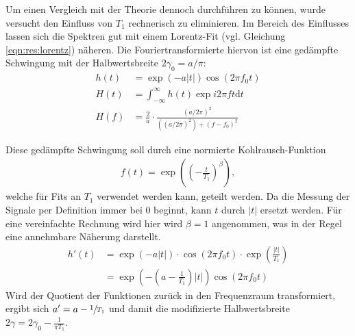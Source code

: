 Um einen Vergleich mit der Theorie dennoch durchführen zu können, wurde versucht den Einfluss von $T_1$ rechnerisch zu eliminieren. Im Bereich des Einflusses lassen sich die Spektren gut mit einem Lorentz-Fit (vgl. Gleichung \eqref{eqn:res:lorentz}) näheren. Die Fouriertransformierte hiervon ist eine gedämpfte Schwingung mit der Halbwertsbreite $2 \gamma_0 = a/\pi$:
\begin{align}
	h(t) & = \exp{(-a |t|)} \cos{(2 \pi f_0 t)} \\
	H(t) & = \int_{-\infty}^{\infty} h(t) \exp{i 2 \pi f t} \text{d} t \\
	H(f) & = \frac{2}{a} \cdot \frac{(a/2\pi)^2}{((a/2\pi)^2) + (f - f_0)^2}
\end{align}

Diese gedämpfte Schwingung soll durch eine normierte Kohlrausch-Funktion
\begin{align}
	f(t) = \exp{\left( {\left(-\frac{t}{T_1} \right)}^\beta \right) },
\end{align}
welche für Fits an $T_1$ verwendet werden kann, geteilt werden. Da die Messung der Signale per Definition immer bei 0 beginnt, kann $t$ durch $|t|$ ersetzt werden. Für eine vereinfachte Rechnung wird hier wird $\beta = 1$ angenommen, was in der Regel eine annehmbare Näherung darstellt.
\begin{align}
	h'(t) &= \exp{(-a \lvert t \rvert)} \cdot \cos{(2 \pi f_0 t)} \cdot \exp{\left(\frac{|t|}{T_1} \right)} \\
	&= \exp{\left(- \left(a - \frac{1}{T_1}\right) |t|\right)} \cos{(2 \pi f_0 t)}
\end{align}
Wird der Quotient der Funktionen zurück in den Frequenzraum transformiert, ergibt sich $a' = a - \sfrac{1}{T_1}$ und damit die modifizierte Halbwertsbreite $2\gamma = 2\gamma_0 - \frac{1}{\pi T_1}$.

